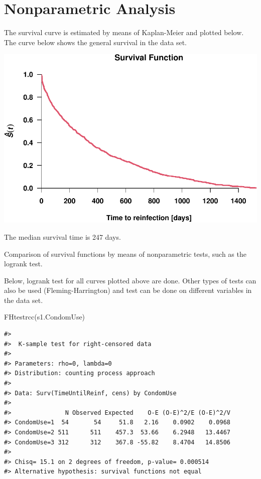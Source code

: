 \documentclass[
]{article}
\newenvironment{Shaded}{\begin{snugshade}}{\end{snugshade}}
\newcommand{\FunctionTok}[1]{\textcolor[rgb]{0.00,0.00,0.00}{#1}}
\newcommand{\NormalTok}[1]{#1}
\begin{document}
\hypertarget{nonparametric-analysis}{%
\section{Nonparametric Analysis}\label{nonparametric-analysis}}

The survival curve is estimated by means of Kaplan-Meier and plotted below. The curve below shows the general survival in the data set.

\includegraphics{practical_files/figure-latex/unnamed-chunk-6-1.pdf}

The median survival time is 247 days.

Comparison of survival functions by means of nonparametric tests, such as the logrank test.

Below, logrank test for all curves plotted above are done. Other types of tests can also be used (Fleming-Harrington) and test can be done on different variables in the data set.

\begin{Shaded}
\begin{Highlighting}[]
\FunctionTok{FHtestrcc}\NormalTok{(s1.CondomUse)}
\end{Highlighting}
\end{Shaded}

\begin{verbatim}
#> 
#>  K-sample test for right-censored data
#> 
#> Parameters: rho=0, lambda=0
#> Distribution: counting process approach
#> 
#> Data: Surv(TimeUntilReinf, cens) by CondomUse
#> 
#>               N Observed Expected    O-E (O-E)^2/E (O-E)^2/V
#> CondomUse=1  54       54     51.8   2.16    0.0902    0.0968
#> CondomUse=2 511      511    457.3  53.66    6.2948   13.4467
#> CondomUse=3 312      312    367.8 -55.82    8.4704   14.8506
#> 
#> Chisq= 15.1 on 2 degrees of freedom, p-value= 0.000514
#> Alternative hypothesis: survival functions not equal
\end{verbatim}
\end{document}
